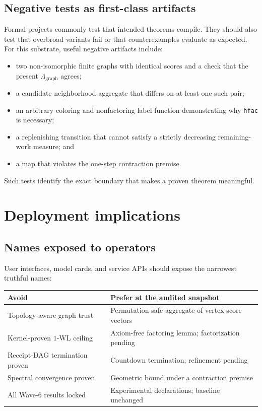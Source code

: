 \documentclass[10pt,letterpaper]{article}
\theoremstyle{definition}
\newcommand{\Lgraph}{\Lambda_{\mathrm{graph}}}
\begin{document}
\subsection{Negative tests as first-class artifacts}
Formal projects commonly test that intended theorems compile. They should also
test that overbroad variants fail or that counterexamples evaluate as expected.
For this substrate, useful negative artifacts include:
\begin{itemize}
\item two non-isomorphic finite graphs with identical scores and a check that
  the present \(\Lgraph\) agrees;
\item a candidate neighborhood aggregate that differs on at least one such
  pair;
\item an arbitrary coloring and nonfactoring label function demonstrating why
  \texttt{hfac} is necessary;
\item a replenishing transition that cannot satisfy a strictly decreasing
  remaining-work measure; and
\item a map that violates the one-step contraction premise.
\end{itemize}
Such tests identify the exact boundary that makes a proven theorem meaningful.

\section{Deployment implications}\label{sec:deploy}
\subsection{Names exposed to operators}
User interfaces, model cards, and service APIs should expose the narrowest
truthful names:
\begin{center}
\begin{tabularx}{0.93\textwidth}{@{}L{0.42\textwidth}Y@{}}
\toprule
Avoid & Prefer at the audited snapshot \\
\midrule
Topology-aware graph trust & Permutation-safe aggregate of vertex score vectors \\
Kernel-proven \(1\)-WL ceiling & Axiom-free factoring lemma; factorization pending \\
Receipt-DAG termination proven & Countdown termination; refinement pending \\
Spectral convergence proven & Geometric bound under a contraction premise \\
All Wave-6 results locked & Experimental declarations; baseline unchanged \\
\bottomrule
\end{tabularx}
\end{center}
\end{document}
